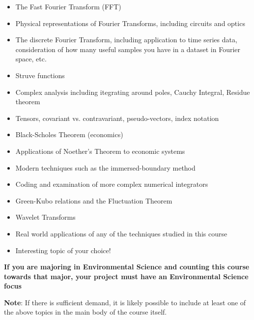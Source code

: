 \documentclass[12pt]{article}
\begin{document}
\begin{itemize}
  \item The Fast Fourier Transform (FFT)
  \item Physical representations of Fourier Transforms, including circuits and optics
  \item The discrete Fourier Transform, including application to time series data, consideration of how many useful samples you have in a dataset in Fourier space, etc.
  \item Struve functions
  \item Complex analysis including itegrating around poles, Cauchy Integral, Residue theorem
  \item Tensors, covariant vs. contravariant, pseudo-vectors, index notation
  \item Black-Scholes Theorem (economics)
  \item Applications of Noether's Theorem to economic systems
  \item Modern techniques such as the immersed-boundary method
  \item Coding and examination of more complex numerical integrators
  \item Green-Kubo relations and the Fluctuation Theorem
  \item Wavelet Transforms
  \item Real world applications of any of the techniques studied in this course
  \item Interesting topic of your choice!
\end{itemize}

\textbf{If you are majoring in Environmental Science and counting this
  course towards that major, your project must have an Environmental
  Science focus}

\textbf{Note}: If there is sufficient demand, it is likely possible to include at least one of the above topics in the main body of the course itself.
\end{document}
